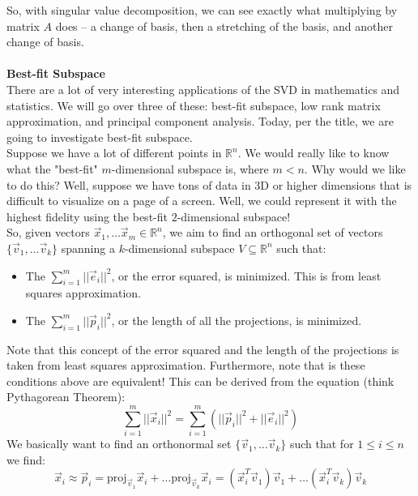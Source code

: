 \documentclass[12pt]{amsart}
\begin{document}
So, with singular value decomposition, we can see exactly what multiplying by matrix $A$ does -- a change of basis, then a stretching of the basis, and another change of basis.
\\
\\
\textbf{Best-fit Subspace}\\
There are a lot of very interesting applications of the SVD in mathematics and statistics. We will go over three of these: best-fit subspace, low rank matrix approximation, and principal component analysis. Today, per the title, we are going to investigate best-fit subspace.\\
Suppose we have a lot of different points in $\mathbb{R}^n$. We would really like to know what the "best-fit" $m$-dimensional subspace is, where $m < n$. Why would we like to do this? Well, suppose we have tons of data in 3D or higher dimensions that is difficult to visualize on a page of a screen. Well, we could represent it with the highest fidelity using the best-fit $2$-dimensional subspace!\\
So, given vectors $\vec{x}_1, \dots \vec{x}_m \in \mathbb{R}^n$, we aim to find an orthogonal set of vectors $\{\vec{v}_1, \dots \vec{v}_k\}$ spanning a $k$-dimensional subspace $V \subseteq \mathbb{R}^n$ such that:
\begin{itemize}
	\item The $\sum_{i=1}^m ||\vec{e}_i||^2$, or the error squared, is minimized. This is from least squares approximation.
	\item The $\sum_{i=1}^m ||\vec{p}_i||^2$, or the length of all the projections, is minimized. 
\end{itemize}
Note that this concept of the error squared and the length of the projections is taken from least squares approximation. Furthermore, note that is these conditions above are equivalent! This can be derived from the equation (think Pythagorean Theorem):
\[\sum_{i=1}^m ||\vec{x}_i||^2 = \sum_{i=1}^m \left(||\vec{p}_i||^2+||\vec{e}_i||^2\right)
\]
We basically want to find an orthonormal set $\{\vec{v}_1, \dots \vec{v}_k\}$ such that for $1 \leq i \leq n$ we find:
\[\vec{x}_i \approx \vec{p}_i = \mathrm{proj}_{\vec{v}_1}\vec{x}_i + \dots \mathrm{proj}_{\vec{v}_k}\vec{x}_i = (\vec{x}_i^T\vec{v}_1)\vec{v}_1 + \dots (\vec{x}_i^T\vec{v}_k)\vec{v}_k\]
\\
\end{document}
